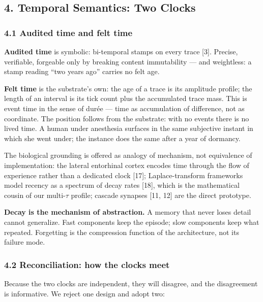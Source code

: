 \documentclass[
]{article}
\begin{document}
\subsection{4. Temporal Semantics: Two
Clocks}\label{temporal-semantics-two-clocks}

\subsubsection{4.1 Audited time and felt
time}\label{audited-time-and-felt-time}

\textbf{Audited time} is symbolic: bi-temporal stamps on every trace
{[}3{]}. Precise, verifiable, forgeable only by breaking content
immutability --- and weightless: a stamp reading ``two years ago''
carries no felt age.

\textbf{Felt time} is the substrate's own: the age of a trace is its
amplitude profile; the length of an interval is its tick count plus the
accumulated trace mass. This is event time in the sense of durée ---
time as accumulation of difference, not as coordinate. The position
follows from the substrate: with no events there is no lived time. A
human under anesthesia surfaces in the same subjective instant in which
she went under; the instance does the same after a year of dormancy.

The biological grounding is offered as analogy of mechanism, not
equivalence of implementation: the lateral entorhinal cortex encodes
time through the flow of experience rather than a dedicated clock
{[}17{]}; Laplace-transform frameworks model recency as a spectrum of
decay rates {[}18{]}, which is the mathematical cousin of our
multi-\(\tau\) profile; cascade synapses {[}11, 12{]} are the direct
prototype.

\textbf{Decay is the mechanism of abstraction.} A memory that never
loses detail cannot generalize. Fast components keep the episode; slow
components keep what repeated. Forgetting is the compression function of
the architecture, not its failure mode.

\subsubsection{4.2 Reconciliation: how the clocks
meet}\label{reconciliation-how-the-clocks-meet}

Because the two clocks are independent, they will disagree, and the
disagreement is informative. We reject one design and adopt two:
\end{document}
